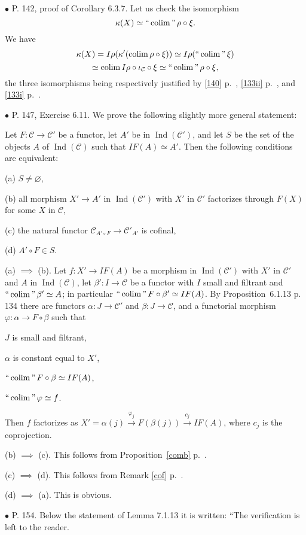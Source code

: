 \documentclass[12pt]{article}
\theoremstyle{remark}%
\newcommand{\bu}{\bullet}
\newcommand{\n}{\noindent}
\newcommand{\cc}{\mathcal}
\newcommand{\C}{\mathcal C}
\newcommand{\p}{\varphi}
\newcommand{\xr}{\xrightarrow}
\newcommand{\pr}{Proposition}
\DeclareMathOperator*{\coli}{colim}
\DeclareMathOperator*{\co}{colim}
\DeclareMathOperator*{\ic}{``\coli"}
\DeclareMathOperator{\Ind}{Ind}
\begin{document}
\n$\bu$ P. 142, proof of Corollary 6.3.7. Let us check the isomorphism 
$$
\kappa(X)\simeq\ic\rho\circ\xi. 
$$ 
We have 
$$
\kappa(X)=I\rho(\kappa'(\co\rho\circ\xi))\simeq I\rho(\ic\xi)
$$
$$
\simeq\co I\rho\circ\iota_\C\circ\xi\simeq\ic\rho\circ\xi, 
$$ 
the three isomorphisms being respectively justified by \eqref{140} p.~\pageref{140}, \eqref{133ii} p.~\pageref{133ii}, and \eqref{133i} p.~\pageref{133i}. 


\n$\bu$ P. 147, Exercise 6.11. We prove the following slightly more general statement: 

Let $F:\cc C\to\cc C'$ be a functor, let $A'$ be in $\Ind(\cc C')$, and let $S$ be the set of the objects $A$ of $\Ind(\cc C)$ such that $IF(A)\simeq A'$. Then the following conditions are equivalent: 

\n(a) $S\neq\varnothing$, 

\n(b) all morphism $X'\to A'$ in $\Ind(\cc C')$ with $X'$ in $\cc C'$ factorizes through $F(X)$ for some $X$ in $\cc C$, 

\n(c) the natural functor $\cc C_{A'\circ F}\to\cc C'_{A'}$ is cofinal, 

\n(d) $A'\circ F\in S$. 

\n{\em Proof.} 

\n(a) $\implies$ (b). Let $f:X'\to IF(A)$ be a morphism in $\Ind(\cc C')$ with $X'$ in $\cc C'$ and $A$ in $\Ind(\cc C)$, let $\beta':I\to\cc C$ be a functor with $I$ small and filtrant and $\ic\beta'\simeq A$; in particular $\ic F\circ\beta'\simeq IF(A)$. By \pr\ 6.1.13 p. 134 there are functors $\alpha:J\to\cc C'$ and $\beta:J\to\cc C$, and a functorial morphism $\p:\alpha\to F\circ\beta$ such that 

$J$ is small and filtrant, 

$\alpha$ is constant equal to $X'$, 

$\ic F\circ\beta\simeq IF(A)$, 

$\ic\p\simeq f$. 

\n Then $f$ factorizes as $X'=\alpha(j)\xr{\p_j}F(\beta(j))\xr{c_j}IF(A)$, where $c_j$ is the coprojection. 

\n(b) $\implies$ (c). This follows from \pr\ \ref{comb} p.~\pageref{comb}. 

\n(c) $\implies$ (d). This follows from Remark \ref{cof} p.~\pageref{cof}. 

\n(d) $\implies$ (a). This is obvious. 


\n$\bu$ P. 154. Below the statement of Lemma 7.1.13 it is written: ``The verification is left to the reader.
\end{document}
